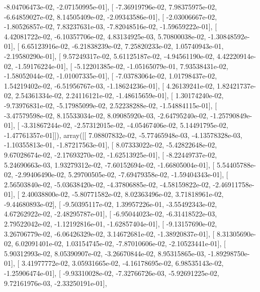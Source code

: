 \documentclass{article}
\begin{document}
         -8.04706473e-02,  -2.07150995e-01],
       [ -7.36919796e-02,   7.98375975e-02,  -6.64859027e-02,
          8.14505409e-02,  -2.09343586e-01],
       [ -2.03006667e-02,  -1.80526857e-02,   7.83237631e-03,
         -7.82048516e-02,  -1.59659222e-01],
       [  4.42081722e-02,  -6.10357706e-02,   4.83134925e-03,
          5.70800038e-02,  -1.30848592e-01],
       [  6.65123916e-02,  -6.21838239e-02,   7.25820233e-02,
          1.05740943e-01,  -2.19580290e-01],
       [  9.57249317e-02,   5.61125187e-02,  -4.94561190e-02,
          4.42220914e-02,  -1.59176224e-01],
       [ -5.12201385e-02,  -1.05165079e-01,   7.93538431e-02,
         -1.58052044e-02,  -1.01007335e-01],
       [ -7.03783064e-02,   1.01798437e-02,   1.54219402e-02,
         -6.51956767e-03,  -1.18624236e-01],
       [  4.26139241e-02,   1.82421737e-02,   2.54361334e-02,
          2.24116121e-02,  -1.48615659e-01],
       [  1.30174240e-02,  -9.73976831e-02,  -5.17985099e-02,
          2.52238288e-02,  -1.54884115e-01],
       [ -3.47579598e-02,   8.15533034e-02,   8.09085920e-03,
         -2.64795240e-02,  -1.25790849e-01],
       [ -3.31867244e-02,  -2.57312015e-02,  -4.05467406e-02,
          5.14491795e-02,  -1.47761357e-01]]), array([[  7.08807832e-02,  -5.77465948e-03,  -4.13578328e-03,
         -1.10355813e-01,  -1.87217563e-01],
       [  8.07333022e-02,  -5.42822648e-02,   9.67028674e-02,
         -2.17693270e-02,  -1.62513925e-01],
       [ -8.22449737e-02,   5.24690663e-03,   1.93279312e-02,
         -7.60152694e-02,  -1.66805004e-01],
       [  5.54405788e-02,  -2.99406490e-02,   5.29700505e-02,
         -7.69479358e-02,  -1.59404343e-01],
       [  2.56503840e-02,  -5.03638420e-02,  -4.37806885e-02,
         -4.58159822e-02,  -2.46911758e-01],
       [  2.40038800e-02,  -5.80771582e-02,   8.02363496e-02,
          3.71818961e-02,  -9.44680893e-02],
       [ -9.50395117e-02,   1.39957226e-01,  -3.55492343e-02,
          4.67262922e-02,  -2.48295787e-01],
       [ -6.95044023e-02,  -6.31418522e-03,   2.79522042e-02,
         -1.12192816e-01,  -1.62857404e-01],
       [ -9.13157690e-02,   3.26706779e-02,  -6.06426329e-02,
          3.14672681e-02,  -1.38920837e-01],
       [  8.31305690e-02,   6.02091401e-02,   1.03154745e-02,
         -7.87010606e-02,  -2.10523441e-01],
       [  5.90312993e-02,   8.05390907e-02,  -3.26670844e-02,
          8.95315865e-03,  -1.89298750e-01],
       [  3.41977772e-02,   3.05931665e-02,  -4.16178695e-02,
          6.98535143e-02,  -1.25906474e-01],
       [ -9.93310028e-02,  -7.32766726e-03,  -5.92691225e-02,
          9.72161976e-03,  -2.33250191e-01],
\end{document}
